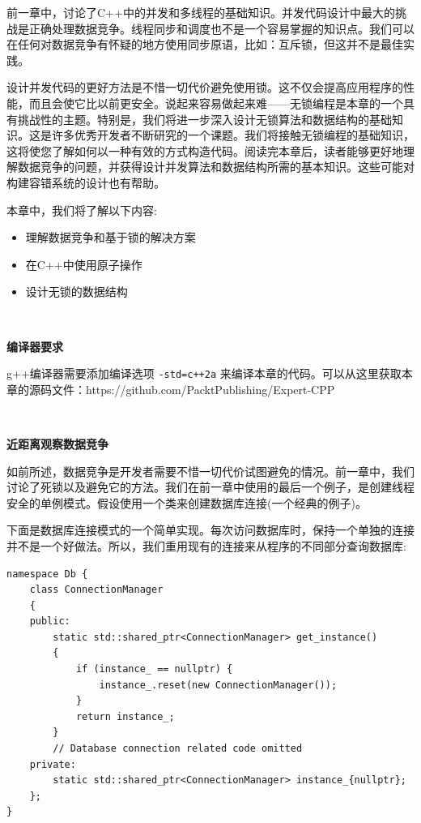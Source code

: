 前一章中，讨论了C++中的并发和多线程的基础知识。并发代码设计中最大的挑战是正确处理数据竞争。线程同步和调度也不是一个容易掌握的知识点。我们可以在任何对数据竞争有怀疑的地方使用同步原语，比如：互斥锁，但这并不是最佳实践。 \par
设计并发代码的更好方法是不惜一切代价避免使用锁。这不仅会提高应用程序的性能，而且会使它比以前更安全。说起来容易做起来难——无锁编程是本章的一个具有挑战性的主题。特别是，我们将进一步深入设计无锁算法和数据结构的基础知识。这是许多优秀开发者不断研究的一个课题。我们将接触无锁编程的基础知识，这将使您了解如何以一种有效的方式构造代码。阅读完本章后，读者能够更好地理解数据竞争的问题，并获得设计并发算法和数据结构所需的基本知识。这些可能对构建容错系统的设计也有帮助。 \par
本章中，我们将了解以下内容: \par

\begin{itemize}
	\item 理解数据竞争和基于锁的解决方案
	\item 在C++中使用原子操作
	\item 设计无锁的数据结构
\end{itemize}

\noindent\textbf{}\ \par
\textbf{编译器要求} \ \par
g++编译器需要添加编译选项 \texttt{-std=c++2a} 来编译本章的代码。可以从这里获取本章的源码文件：https:/​/github.​com/PacktPublishing/Expert-CPP \par

\noindent\textbf{}\ \par
\textbf{近距离观察数据竞争} \ \par
如前所述，数据竞争是开发者需要不惜一切代价试图避免的情况。前一章中，我们讨论了死锁以及避免它的方法。我们在前一章中使用的最后一个例子，是创建线程安全的单例模式。假设使用一个类来创建数据库连接(一个经典的例子)。 \par
下面是数据库连接模式的一个简单实现。每次访问数据库时，保持一个单独的连接并不是一个好做法。所以，我们重用现有的连接来从程序的不同部分查询数据库: \par

\begin{lstlisting}[caption={}]
namespace Db {
	class ConnectionManager
	{
	public:
		static std::shared_ptr<ConnectionManager> get_instance()
		{
			if (instance_ == nullptr) {
				instance_.reset(new ConnectionManager());
			}
			return instance_;
		}
		// Database connection related code omitted
	private:
		static std::shared_ptr<ConnectionManager> instance_{nullptr};
	};
}
\end{lstlisting}


